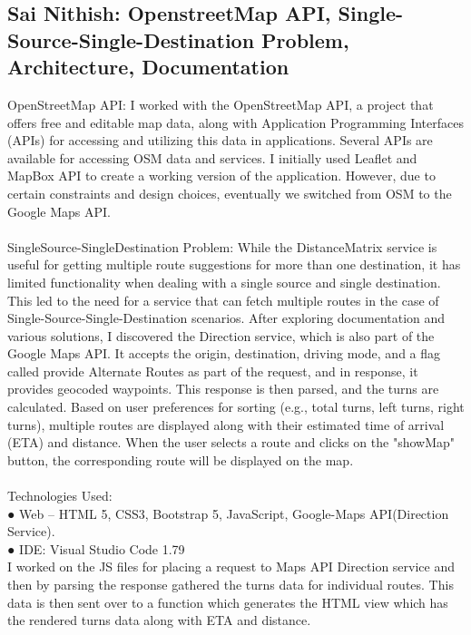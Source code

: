 \documentclass{article}
\begin{document}
\subsection{Sai Nithish: OpenstreetMap API, Single-Source-Single-Destination Problem, Architecture, Documentation }
OpenStreetMap API:
I worked with the OpenStreetMap API, a project that offers free and editable map data, along with Application Programming Interfaces (APIs) for accessing and utilizing this data in applications. Several APIs are available for accessing OSM data and services. I initially used Leaflet and MapBox API to create a working version of the application. However, due to certain constraints and design choices, eventually we switched from OSM to the Google Maps API.
\\
\\
SingleSource-SingleDestination Problem:
While the DistanceMatrix service is useful for getting multiple route suggestions for more than one destination, it has limited functionality when dealing with a single source and single destination. This led to the need for a service that can fetch multiple routes in the case of Single-Source-Single-Destination scenarios. After exploring documentation and various solutions, I discovered the Direction service, which is also part of the Google Maps API. It accepts the origin, destination, driving mode, and a flag called provide Alternate Routes as part of the request, and in response, it provides geocoded waypoints. This response is then parsed, and the turns are calculated. Based on user preferences for sorting (e.g., total turns, left turns, right turns), multiple routes are displayed along with their estimated time of arrival (ETA) and distance. When the user selects a route and clicks on the "showMap" button, the corresponding route will be displayed on the map.
\\\\
Technologies Used:  \\
●	Web – HTML 5, CSS3, Bootstrap 5, JavaScript, Google-Maps API(Direction Service).\\
●	IDE: Visual Studio Code 1.79 \\
I worked on the JS files for placing a request to Maps API Direction service and then by parsing the response gathered the turns data for individual routes. This data is then sent over to a function which generates the HTML view which has the rendered turns data along with ETA and distance.
\end{document}
